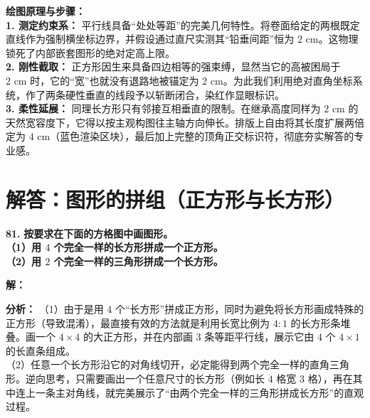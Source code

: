 \documentclass[12pt, a4paper]{ctexrep}
\begin{document}
\vspace{0.4cm}
{\small\color{blue!70!black}
\textbf{绘图原理与步骤：}\\
\textbf{1. 测定约束系：} 平行线具备“处处等距”的完美几何特性。将卷面给定的两根既定直线作为强制横坐标边界，并假设通过直尺实测其“铅垂间距”恒为 $2\text{ cm}$。这物理锁死了内部嵌套图形的绝对定高上限。\\
\textbf{2. 刚性截取：} 正方形因生来具备四边相等的强束缚，显然当它的高被困局于 $2\text{ cm}$ 时，它的“宽”也就没有退路地被锚定为 $2\text{ cm}$。为此我们利用绝对直角坐标系统，作了两条硬性垂直的线段予以斩断闭合，染红作显眼标识。\\
\textbf{3. 柔性延展：} 同理长方形只有邻接互相垂直的限制。在继承高度同样为 $2\text{ cm}$ 的天然宽容度下，它得以按主观构图往主轴方向伸长。排版上自由将其长度扩展两倍定为 $4\text{ cm}$（蓝色渲染区块），最后加上完整的顶角正交标识符，彻底夯实解答的专业感。
}

\newpage

\section{解答：图形的拼组（正方形与长方形）}

\vspace{0.6cm}

\textbf{\LARGE 81.} \textbf{按要求在下面的方格图中画图形。\\[1ex]
（1）用 $4$ 个完全一样的长方形拼成一个正方形。\\[1ex]
（2）用 $2$ 个完全一样的三角形拼成一个长方形。}

\vspace{0.4cm}
\textbf{解：}

\textbf{分析：}
（1）由于是用 $4$ 个“长方形”拼成正方形，同时为避免将长方形画成特殊的正方形（导致混淆），最直接有效的方法就是利用长宽比例为 $4:1$ 的长方形条堆叠。画一个 $4 \times 4$ 的大正方形，并在内部画 $3$ 条等距平行线，展示它由 $4$ 个 $4\times 1$ 的长直条组成。\\
（2）任意一个长方形沿它的对角线切开，必定能得到两个完全一样的直角三角形。逆向思考，只需要画出一个任意尺寸的长方形（例如长 $4$ 格宽 $3$ 格），再在其中连上一条主对角线，就完美展示了“由两个完全一样的三角形拼成长方形”的直观过程。
\end{document}
